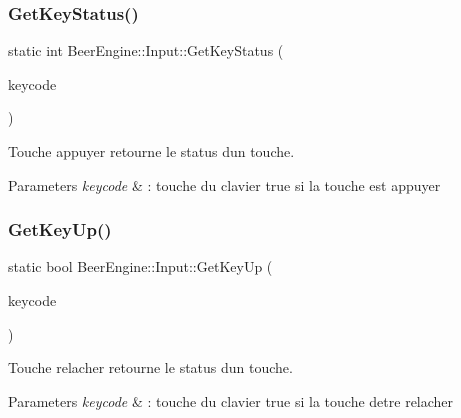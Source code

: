 \subsubsection{\texorpdfstring{Get\+Key\+Status()}{GetKeyStatus()}}
{\footnotesize\ttfamily static int Beer\+Engine\+::\+Input\+::\+Get\+Key\+Status (\begin{DoxyParamCaption}\item[{\mbox{\hyperlink{namespace_beer_engine_a94f0b552f6dc910de8cdb44207981f53}{Key\+Code}}}]{keycode }\end{DoxyParamCaption})\hspace{0.3cm}{\ttfamily [static]}}



Touche appuyer retourne le status d\textquotesingle{}un touche. 


\begin{DoxyParams}{Parameters}
{\em keycode} & \+: touche du clavier  true si la touche est appuyer \\
\hline
\end{DoxyParams}
\mbox{\label{class_beer_engine_1_1_input_aace9501b3e8bde001dc46dea904504b0}} 
\subsubsection{\texorpdfstring{Get\+Key\+Up()}{GetKeyUp()}}
{\footnotesize\ttfamily static bool Beer\+Engine\+::\+Input\+::\+Get\+Key\+Up (\begin{DoxyParamCaption}\item[{\mbox{\hyperlink{namespace_beer_engine_a94f0b552f6dc910de8cdb44207981f53}{Key\+Code}}}]{keycode }\end{DoxyParamCaption})\hspace{0.3cm}{\ttfamily [static]}}



Touche relacher retourne le status d\textquotesingle{}un touche. 


\begin{DoxyParams}{Parameters}
{\em keycode} & \+: touche du clavier  true si la touche d\textquotesingle{}etre relacher \\
\hline
\end{DoxyParams}
\mbox{\label{class_beer_engine_1_1_input_a5f1cf046547a086a7f44d7c18ad6776d}} 
